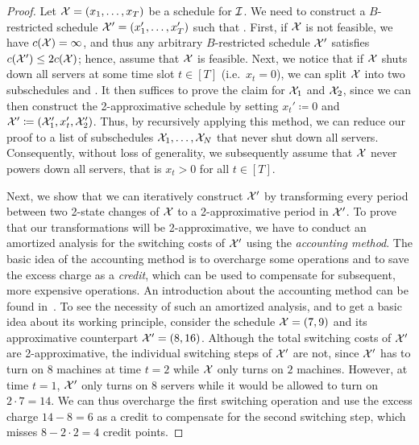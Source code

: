 \begin{proof}
Let $\mathcal{X}=(x_1,\dotsc,x_T)$ be a schedule for $\mathcal{I}$. We need to construct a $B$-restricted schedule $\mathcal{X}'=(x_1',\dotsc,x_T')$ such that .
First, if $\mathcal{X}$ is not feasible, we have $c(\mathcal{X})=\infty$, and thus any arbitrary $B$-restricted schedule $\mathcal{X}'$ satisfies $c(\mathcal{X}')\le2c(\mathcal{X})$; hence, assume that $\mathcal{X}$ is feasible. Next, we notice that if $\mathcal{X}$ shuts down all servers at some time slot $t\in[T]$ (i.e.\ $x_t=0$), we can split $\mathcal{X}$ into two subschedules  and . It then suffices to prove the claim for $\mathcal{X}_1$ and $\mathcal{X}_2$, since we can then construct the 2-approximative schedule by setting $x_t'\coloneqq 0$ and $\mathcal{X}'\coloneqq(\mathcal{X}_1',x_t',\mathcal{X}_2')$. Thus, by recursively applying this method, we can reduce our proof to a list of subschedules $\mathcal{X}_1,\dotsc,\mathcal{X}_N$ that never shut down all servers. Consequently, without loss of generality, we subsequently assume that $\mathcal{X}$ never powers down all servers, that is $x_t>0$ for all $t\in[T]$. 
	
Next, we show that we can iteratively construct $\mathcal{X}'$ by transforming every period between two 2-state changes of $\mathcal{X}$ to a 2-approximative period in $\mathcal{X}'$. 
To prove that our transformations will be 2-approximative, we have to conduct an amortized analysis for the switching costs of $\mathcal{X}'$ using the \emph{accounting method}. The basic idea of the accounting method is to overcharge some operations and to save the excess charge as a \emph{credit}, which can be used to compensate for subsequent, more expensive operations. An introduction about the accounting method can be found in~\parencite[Section~17.2]{intro-algo}. To see the necessity of such an amortized analysis, and to get a basic idea about its working principle, consider the schedule $\mathcal{X}=(7,9)$ and its approximative counterpart $\mathcal{X}'=(8,16)$. Although the total switching costs of $\mathcal{X}'$ are 2-approximative, the individual switching steps of $\mathcal{X}'$ are not, since $\mathcal{X}'$ has to turn on $8$ machines at time $t=2$ while $\mathcal{X}$ only turns on $2$ machines. However, at time $t=1$, $\mathcal{X}'$ only turns on $8$ servers while it would be allowed to turn on $2\cdot7=14$. We can thus overcharge the first switching operation and use the excess charge $14-8=6$ as a credit to compensate for the second switching step, which misses $8-2\cdot2=4$ credit points.


\end{proof}

